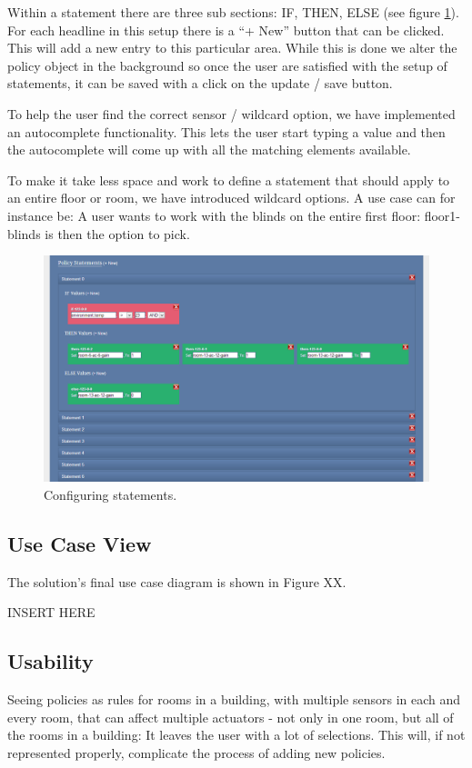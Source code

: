Within a statement there are three sub sections: IF, THEN, ELSE (see figure \ref{fig:statement}). For each headline in this setup there is a "`+ New"' button that can be clicked. This will add a new entry to this particular area. While this is done we alter the policy object in the background so once the user are satisfied with the setup of statements, it can be saved with a click on the update / save button.

To help the user find the correct sensor / wildcard option, we have implemented an autocomplete functionality. This lets the user start typing a value and then the autocomplete will come up with all the matching elements available.

To make it take less space and work to define a statement that should apply to an entire floor or room, we have introduced wildcard options. A use case can for instance be: A user wants to work with the blinds on the entire first floor: floor1-blinds is then the option to pick.

\begin{figure}[ht]
\centering
\includegraphics[width=\columnwidth]{statement.png}
\caption{Configuring statements.}
\label{fig:statement}
\end{figure}

\subsection{Use Case View}
The solution’s ﬁnal use case diagram is shown in Figure XX.

INSERT HERE

\subsection{Usability}
Seeing policies as rules for rooms in a building, with multiple sensors in each and every room, that can affect multiple actuators - not only in one room, but all of the rooms in a building: It leaves the user with a lot of selections. 
This will, if not represented properly, complicate the process of adding new policies.

